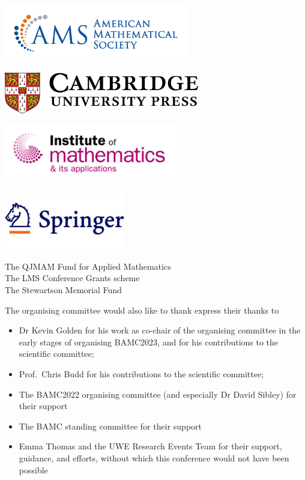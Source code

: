\documentclass[12pt,a4paper]{article}
\begin{document}
{\centering
\includegraphics[height=2.5cm]{ams-logo.png}

\includegraphics[height=1.8cm]{cup-logo.png}

\includegraphics[height=2.5cm]{ima-logo.png}

\includegraphics[height=2.5cm]{springer-logo.jpg}

}

{\centering
{\large The QJMAM Fund for Applied Mathematics} \\[18pt]
{\large The LMS Conference Grants scheme} \\[18pt] 
{\large The Stewartson Memorial Fund}

}

\vspace{18pt}
The organising committee would also like to thank express their thanks to
\begin{itemize}
    \item  Dr Kevin Golden for his work as co-chair of the organising committee in the early stages of organising BAMC2023, and for his contributions to the scientific committee; 
    \item Prof.\ Chris Budd for his contributions to the scientific committee;
    \item The BAMC2022 organising committee (and especially Dr David Sibley) for their support
    \item The BAMC standing committee for their support
    \item Emma Thomas and the UWE Research Events Team for their support, guidance, and efforts, without which this conference would not have been possible
\end{itemize}





\end{document}
